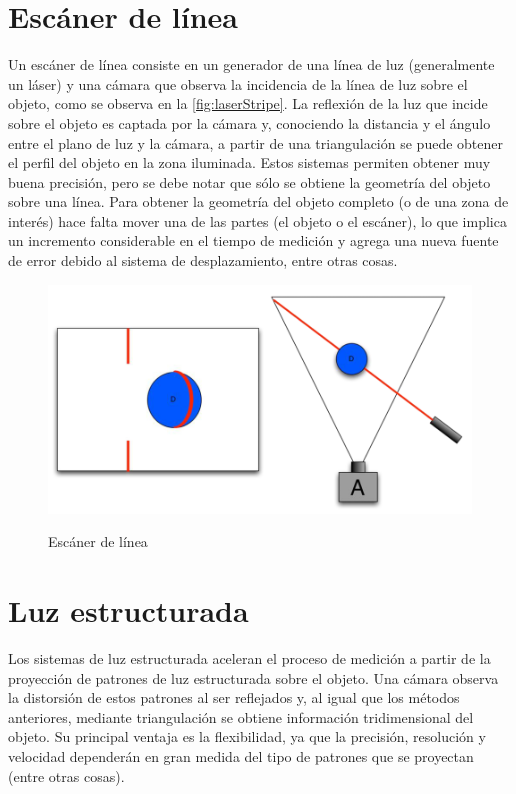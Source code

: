 \section{Escáner de línea}
Un escáner de línea consiste en un generador de una línea de luz (generalmente un láser) y una cámara que observa la incidencia de la línea de luz sobre el objeto, como se observa en la \autoref{fig:laserStripe}. La reflexión de la luz que incide sobre el objeto es captada por la cámara y, conociendo la distancia y el ángulo entre el plano de luz y la cámara, a partir de una triangulación se puede obtener el perfil del objeto en la zona iluminada. Estos sistemas permiten obtener muy buena precisión, pero se debe notar que sólo se obtiene la geometría del objeto sobre una línea. Para obtener la geometría del objeto completo (o de una zona de interés) hace falta mover una de las partes (el objeto o el escáner), lo que implica un incremento considerable en el tiempo de medición y agrega una nueva fuente de error debido al sistema de desplazamiento, entre otras cosas.

\begin{figure}[!bth]
    \myfloatalign
        {\includegraphics[width=0.9\linewidth]{images/laserStripe}}
        \caption{Escáner de línea}
        \label{fig:laserStripe}
\end{figure}

\section{Luz estructurada}
Los sistemas de luz estructurada aceleran el proceso de medición a partir de la proyección de patrones de luz estructurada sobre el objeto. Una cámara observa la distorsión de estos patrones al ser reflejados y, al igual que los métodos anteriores, mediante triangulación se obtiene información tridimensional del objeto. Su principal ventaja es la flexibilidad, ya que la precisión, resolución y velocidad dependerán en gran medida del tipo de patrones que se proyectan (entre otras cosas).

